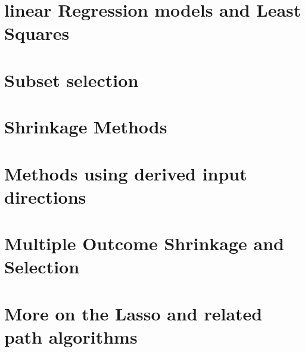 \section{linear Regression models and Least Squares}

\section{Subset selection}

\section{Shrinkage Methods}

\section{Methods using derived input directions}

\section{Multiple Outcome Shrinkage and Selection}

\section{More on the Lasso and related path algorithms}

